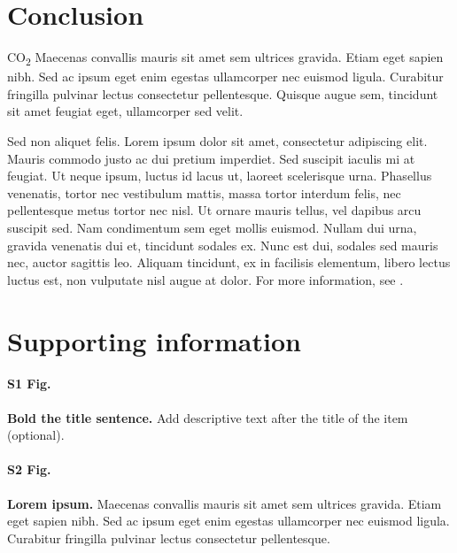 \documentclass[10pt,letterpaper]{article} %
\begin{document}

\section{Conclusion} %

CO\textsubscript{2} Maecenas convallis mauris sit amet sem ultrices gravida. Etiam eget sapien nibh. Sed ac ipsum eget enim egestas ullamcorper nec euismod ligula. Curabitur fringilla pulvinar lectus consectetur pellentesque. Quisque augue sem, tincidunt sit amet feugiat eget, ullamcorper sed velit. 

Sed non aliquet felis. Lorem ipsum dolor sit amet, consectetur adipiscing elit. Mauris commodo justo ac dui pretium imperdiet. Sed suscipit iaculis mi at feugiat. Ut neque ipsum, luctus id lacus ut, laoreet scelerisque urna. Phasellus venenatis, tortor nec vestibulum mattis, massa tortor interdum felis, nec pellentesque metus tortor nec nisl. Ut ornare mauris tellus, vel dapibus arcu suscipit sed. Nam condimentum sem eget mollis euismod. Nullam dui urna, gravida venenatis dui et, tincidunt sodales ex. Nunc est dui, sodales sed mauris nec, auctor sagittis leo. Aliquam tincidunt, ex in facilisis elementum, libero lectus luctus est, non vulputate nisl augue at dolor. For more information, see .
\section{Supporting information} %

\paragraph*{S1 Fig.}
\label{S1_Fig}
{\bf Bold the title sentence.} Add descriptive text after the title of the item (optional).

\paragraph*{S2 Fig.}
\label{S2_Fig}
{\bf Lorem ipsum.} Maecenas convallis mauris sit amet sem ultrices gravida. Etiam eget sapien nibh. Sed ac ipsum eget enim egestas ullamcorper nec euismod ligula. Curabitur fringilla pulvinar lectus consectetur pellentesque.
\end{document}
